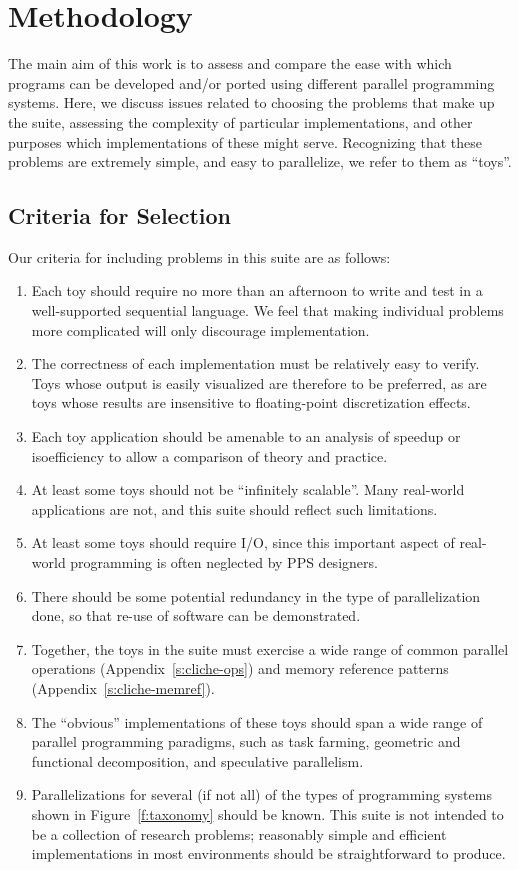 \section{Methodology\label{s:method}}

The main aim of this work is to assess and compare
the ease with which programs can be developed and/or ported
using different parallel programming systems.
Here,
we discuss issues related to choosing the problems that make up the suite,
assessing the complexity of particular implementations,
and other purposes which implementations of these might serve.
Recognizing that these problems are extremely simple,
and easy to parallelize,
we refer to them as ``toys''.

\subsection{Criteria for Selection\label{s:method-criteria}}

Our criteria for including problems in this suite are as follows:
\begin{enumerate}
\item	Each toy should require no more than an afternoon
	to write and test in a well-supported sequential language.
	We feel that making individual problems more complicated will only discourage implementation.
\item	The correctness of each implementation must be relatively easy to verify.
	Toys whose output is easily visualized are therefore to be preferred,
	as are toys whose results are insensitive to floating-point discretization effects.
\item	Each toy application should be amenable to
	an analysis of speedup or isoefficiency \cite{b:isoefficiency-tutorial}
	to allow a comparison of theory and practice.
\item	At least some toys should not be ``infinitely scalable''.
	Many real-world applications are not,
	and this suite should reflect such limitations.
\item	At least some toys should require I/O,
	since this important aspect of real-world programming is often neglected by PPS designers.
\item	There should be some potential redundancy in the type of parallelization done,
	so that re-use of software can be demonstrated.
\item	Together,
	the toys in the suite must exercise a wide range of common parallel operations
	(Appendix~\ref{s:cliche-ops})
	and memory reference patterns
	(Appendix~\ref{s:cliche-memref}).
\item	The ``obvious'' implementations of these toys should span
	a wide range of parallel programming paradigms,
	such as task farming,
	geometric and functional decomposition,
	and speculative parallelism.
\item	Parallelizations for several (if not all) of
	the types of programming systems shown in Figure~\ref{f:taxonomy} should be known.
	This suite is not intended to be a collection of research problems;
	reasonably simple and efficient implementations in most environments
	should be straightforward to produce.
\end{enumerate}

